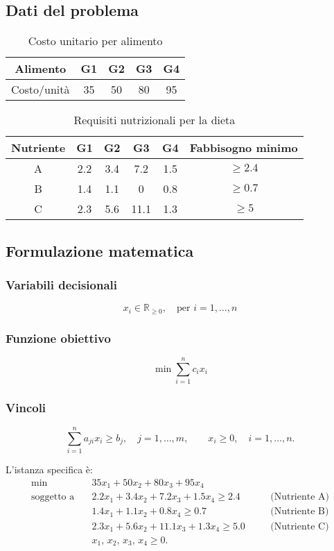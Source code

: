 \subsection{Dati del problema}
\begin{table}[h]
\centering
\begin{tabular}{|c|c|c|c|c|}
\hline
Alimento & G1 & G2 & G3 & G4 \\ \hline
Costo/unità & 35 & 50 & 80 & 95 \\ \hline
\end{tabular}
\caption{Costo unitario per alimento}
\end{table}

\begin{table}[h]
\centering
\begin{tabular}{|c|c|c|c|c|c|}
\hline
Nutriente & G1 & G2 & G3 & G4 & Fabbisogno minimo \\
\hline
A & 2.2 & 3.4 & 7.2 & 1.5 & $\geq 2.4$ \\
\hline
B & 1.4 & 1.1 & 0 & 0.8 & $\geq 0.7$ \\
\hline
C & 2.3 & 5.6 & 11.1 & 1.3 & $\geq 5$ \\
\hline
\end{tabular}
\caption{Requisiti nutrizionali per la dieta}
\end{table}

\subsection{Formulazione matematica}

\subsubsection{Variabili decisionali}
\[
x_i \in \mathbb{R}_{\geq 0}, \quad \text{per } i = 1, \dots, n
\]

\subsubsection{Funzione obiettivo}
\[
\min \sum_{i=1}^{n} c_i x_i
\]

\subsubsection{Vincoli}
\[
\sum_{i=1}^{n} a_{ji} x_i \geq b_j,\quad j = 1, \dots, m,\qquad x_i \geq 0, \quad i = 1, \dots, n.
\]

L'istanza specifica è:
\begin{align}
\min \quad & 35x_1 + 50x_2 + 80x_3 + 95x_4 \\[2mm]
\text{soggetto a} \quad 
& 2.2x_1 + 3.4x_2 + 7.2x_3 + 1.5x_4 \geq 2.4 \quad && \text{(Nutriente A)} \\[1mm]
& 1.4x_1 + 1.1x_2 + 0.8x_4 \geq 0.7 \quad && \text{(Nutriente B)} \\[1mm]
& 2.3x_1 + 5.6x_2 + 11.1x_3 + 1.3x_4 \geq 5.0 \quad && \text{(Nutriente C)} \\[1mm]
& x_1, \, x_2, \, x_3, \, x_4 \geq 0.
\end{align}

